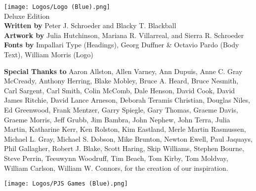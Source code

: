 \begin{titlepage}
    \centering
    \texttt{[image: Logos/Logo (Blue).png]}
    \morrisroman\fontsize{32}{34}\selectfont\color{blue}\\Deluxe Edition\\
    \bigskip\bigskip
    \normalsize\normalfont
    \textbf{Written by} Peter J. Schroeder and Blacky T. Blackball\\
    \textbf{Artwork by} Julia Hutchinson, Mariana R. Villarreal, and Sierra R. Schroeder\\
    \textbf{Fonts by} Impallari Type (Headings), Georg Duffner \& Octavio Pardo (Body Text), William Morris (Logo)\\
    \vfill
    \begin{flushleft}
        \textbf{Special Thanks to} Aaron Allston, Allen Varney, Ann Dupuis, Anne C. Gray McCready, Anthony Herring, Blake Mobley, Bruce A. Heard, Bruce Nesmith, Carl Sargent, Carl Smith, Colin McComb, Dale Henson, David Cook, David James Ritchie, David Lance Arneson, Deborah Teramis Christian, Douglas Niles, Ed Greenwood, Frank Mentzer, Garry Spiegle, Gary Thomas, Graeme Davis, Graeme Morris, Jeff Grubb, Jim Bambra, John Nephew, John Terra, Julia Martin, Katharine Kerr, Ken Rolston, Kim Eastland, Merle Martin Rasmussen, Michael L. Gray, Michael S. Dobson, Mike Brunton, Newton Ewell, Paul Jaquays, Phil Gallagher, Robert J. Blake, Scott Haring, Skip Williams, Stephen Bourne, Steve Perrin, Teeuwynn Woodruff, Tim Beach, Tom Kirby, Tom Moldvay, William Carlson, William W. Connors, for the creation of our inspiration.\\
    \end{flushleft}
    \bigskip
    \texttt{[image: Logos/PJS Games (Blue).png]}
\end{titlepage}

